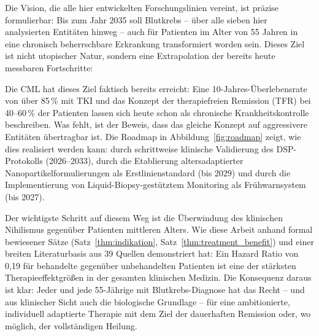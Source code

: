 ﻿\documentclass[12pt,a4paper]{article}
\theoremstyle{definition}
\begin{document}
Die Vision, die alle hier entwickelten Forschungslinien vereint, ist präzise formulierbar:
Bis zum Jahr 2035 soll Blutkrebs -- über alle sieben hier analysierten Entitäten hinweg
-- auch für Patienten im Alter von 55 Jahren in eine chronisch beherrschbare Erkrankung
transformiert worden sein. Dieses Ziel ist nicht utopischer Natur, sondern eine
Extrapolation der bereits heute messbaren Fortschritte:

Die CML hat dieses Ziel faktisch bereits erreicht: Eine 10-Jahres-Überlebensrate
von über 85\,\% mit TKI und das Konzept der therapiefreien Remission (TFR) bei 40--60\,\%
der Patienten lassen sich heute schon als chronische Krankheitskontrolle beschreiben.
Was fehlt, ist der Beweis, dass das gleiche Konzept auf aggressivere Entitäten übertragbar
ist. Die Roadmap in Abbildung~\ref{fig:roadmap} zeigt, wie dies realisiert werden kann:
durch schrittweise klinische Validierung des DSP-Protokolls (2026--2033), durch die
Etablierung altersadaptierter Nanopartikelformulierungen als Erstlinienstandard
(bis 2029) und durch die Implementierung von Liquid-Biopsy-gestütztem Monitoring
als Frühwarnsystem (bis 2027).

Der wichtigste Schritt auf diesem Weg ist die Überwindung des klinischen Nihilismus
gegenüber Patienten mittleren Alters. Wie diese Arbeit anhand formal bewiesener
Sätze (Satz~\ref{thm:indikation}, Satz~\ref{thm:treatment_benefit}) und einer breiten
Literaturbasis aus 39 Quellen demonstriert hat: Ein Hazard Ratio von 0,19 für
behandelte gegenüber unbehandelten Patienten ist eine der stärksten Therapieeffektgrößen
in der gesamten klinischen Medizin. Die Konsequenz daraus ist klar: Jeder und jede
55-Jährige mit Blutkrebs-Diagnose hat das Recht -- und aus klinischer Sicht auch die
biologische Grundlage -- für eine ambitionierte, individuell adaptierte Therapie mit
dem Ziel der dauerhaften Remission oder, wo möglich, der vollständigen Heilung.
\end{document}
